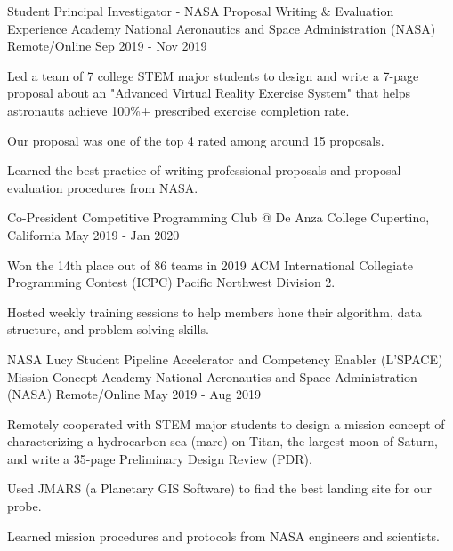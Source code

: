 \begin{cventries}
  \cventry
    {Student Principal Investigator - NASA Proposal Writing \& Evaluation Experience Academy} %
    {National Aeronautics and Space Administration (NASA)} %
    {Remote/Online} %
    {Sep 2019 - Nov 2019} %
    {
	\begin{cvitems} %
      	\item Led a team of 7 college STEM major students to design and write a 7-page proposal about an "Advanced Virtual Reality Exercise System" that helps astronauts achieve 100\%+ prescribed exercise completion rate. 
      	\item Our proposal was one of the top 4 rated among around 15 proposals.
      	\item Learned the best practice of writing professional proposals and proposal evaluation procedures from NASA.
	\end{cvitems}
    }
    
  \cventry
    {Co-President} %
    {Competitive Programming Club @ De Anza College} %
    {Cupertino, California} %
    {May 2019 - Jan 2020} %
    {
	\begin{cvitems} %
      	\item Won the 14th place out of 86 teams in 2019 ACM International Collegiate Programming Contest (ICPC) Pacific Northwest Division 2. 
      	\item Hosted weekly training sessions to help members hone their algorithm, data structure, and problem-solving skills. 
	\end{cvitems}
    }    
    
    \cventry
    {NASA Lucy Student Pipeline Accelerator and Competency Enabler (L'SPACE) Mission Concept Academy} %
    {National Aeronautics and Space Administration (NASA)} %
    {Remote/Online} %
    {May 2019 - Aug 2019} %
    {
	\begin{cvitems} %
      	\item Remotely cooperated with STEM major students to design a mission concept of characterizing a hydrocarbon sea (mare) on Titan, the largest moon of Saturn, and write a 35-page Preliminary Design Review (PDR). 
      	\item Used JMARS (a Planetary GIS Software) to find the best landing site for our probe.
      	\item Learned mission procedures and protocols from NASA engineers and scientists. 
	\end{cvitems}
    }  
    

\end{cventries}

